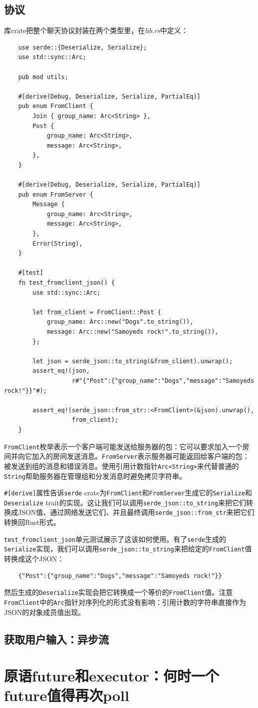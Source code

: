 \subsection{协议}
库crate把整个聊天协议封装在两个类型里，在\emph{lib.rs}中定义：
\begin{verbatim}
    use serde::{Deserialize, Serialize};
    use std::sync::Arc;

    pub mod utils;

    #[derive(Debug, Deserialize, Serialize, PartialEq)]
    pub enum FromClient {
        Join { group_name: Arc<String> },
        Post {
            group_name: Arc<String>,
            message: Arc<String>,
        },
    }

    #[derive(Debug, Deserialize, Serialize, PartialEq)]
    pub enum FromServer {
        Message {
            group_name: Arc<String>,
            message: Arc<String>,
        },
        Error(String),
    }

    #[test]
    fn test_fromclient_json() {
        use std::sync::Arc;

        let from_client = FromClient::Post {
            group_name: Arc::new("Dogs".to_string()),
            message: Arc::new("Samoyeds rock!".to_string()),
        };

        let json = serde_json::to_string(&from_client).unwrap();
        assert_eq!(json,
                   r#"{"Post":{"group_name":"Dogs","message":"Samoyeds rock!"}}"#);
        
        assert_eq!(serde_json::from_str::<FromClient>(&json).unwrap(),
                   from_client);
    }
\end{verbatim}

\texttt{FromClient}枚举表示一个客户端可能发送给服务器的包：它可以要求加入一个房间并向它加入的房间发送消息。\texttt{FromServer}表示服务器可能返回给客户端的包：被发送到组的消息和错误消息。使用引用计数指针\texttt{Arc<String>}来代替普通的\texttt{String}帮助服务器在管理组和分发消息时避免拷贝字符串。

\texttt{\#[derive]}属性告诉\texttt{serde} crate为\texttt{FromClient}和\texttt{FromServer}生成它的\texttt{Serialize}和\texttt{Deserialize} trait的实现。这让我们可以调用\texttt{serde\_json::to\_string}来把它们转换成JSON值、通过网络发送它们、并且最终调用\texttt{serde\_json::from\_str}来把它们转换回Rust形式。

\texttt{test\_fromclient\_json}单元测试展示了这该如何使用。有了\texttt{serde}生成的\texttt{Serialize}实现，我们可以调用\texttt{serde\_json::to\_string}来把给定的\texttt{FromClient}值转换成这个JSON：
\begin{verbatim}
    {"Post":{"group_name":"Dogs","message":"Samoyeds rock!"}}
\end{verbatim}

然后生成的\texttt{Deserialize}实现会把它转换成一个等价的\texttt{FromClient}值。注意\texttt{FromClient}中的\texttt{Arc}指针对序列化的形式没有影响：引用计数的字符串直接作为JSON的对象成员值出现。

\subsection{获取用户输入：异步流}


\section{原语future和executor：何时一个future值得再次poll}\label{WhenPoll}
